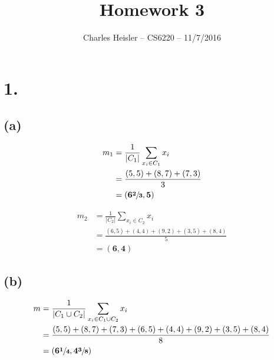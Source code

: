 \documentclass[12pt]{article}
\title{Homework 3}
\author{Charles Heisler -- CS6220 -- 11/7/2016}
\date{}
\begin{document}
	\maketitle

	\section*{1.}
	\subsection*{(a)}
	\begingroup
	\addtolength{\jot}{1em}
	\begin{align*}
		m_1 &= \frac{1}{\lvert C_1 \rvert}\sum_{x_i \in C_1}x_i \\
		&= \frac{\left(5,5\right)+\left(8,7\right)+\left(7,3\right)}{3} \\
		&= \mathbf{\left(6\sfrac{2}{3},5\right)}
	\end{align*}
	\endgroup

	\begingroup
	\addtolength{\jot}{1em}
	\begin{align*}
		m_2 &= \frac{1}{\lvert C_2 \rvert}\sum_{x_i \in C_2}x_i \\
		&= \frac{\left(6,5\right)+\left(4,4\right)+\left(9,2\right)+\left(3,5\right)+\left(8,4\right)}{5} \\
		&= \mathbf{\left(6,4\right)}
	\end{align*}
	\endgroup

	\subsection*{(b)}
	\begingroup
	\addtolength{\jot}{1em}
	\begin{align*}
		m &= \frac{1}{\lvert C_1 \cup C_2 \rvert}\sum_{x_i \in C_1 \cup C_2}x_i \\
		&= \frac{\left(5,5\right)+\left(8,7\right)+\left(7,3\right)+\left(6,5\right)+\left(4,4\right)+\left(9,2\right)+\left(3,5\right)+\left(8,4\right)}{8} \\
		&= \mathbf{\left(6\sfrac{1}{4},4\sfrac{3}{8}\right)}
	\end{align*}
	\endgroup
\end{document}
